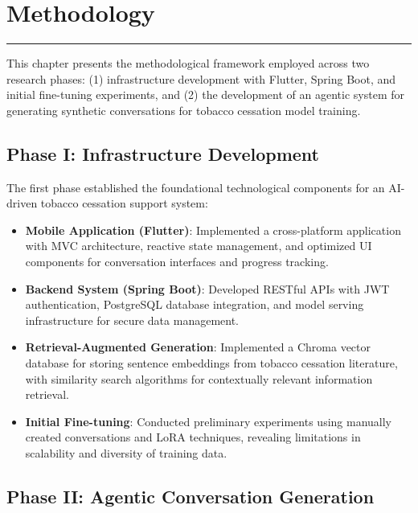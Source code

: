 \chapter{Methodology}
\label{Chapter4}

\begin{center}
\rule{0.5\textwidth}{0.5pt}
\end{center}

This chapter presents the methodological framework employed across two research phases: (1) infrastructure development with Flutter, Spring Boot, and initial fine-tuning experiments, and (2) the development of an agentic system for generating synthetic conversations for tobacco cessation model training.

\section{Phase I: Infrastructure Development}

The first phase established the foundational technological components for an AI-driven tobacco cessation support system:

\begin{itemize}
    \item \textbf{Mobile Application (Flutter)}: Implemented a cross-platform application with MVC architecture, reactive state management, and optimized UI components for conversation interfaces and progress tracking.

    \item \textbf{Backend System (Spring Boot)}: Developed RESTful APIs with JWT authentication, PostgreSQL database integration, and model serving infrastructure for secure data management.

    \item \textbf{Retrieval-Augmented Generation}: Implemented a Chroma vector database for storing sentence embeddings from tobacco cessation literature, with similarity search algorithms for contextually relevant information retrieval.

    \item \textbf{Initial Fine-tuning}: Conducted preliminary experiments using manually created conversations and LoRA techniques, revealing limitations in scalability and diversity of training data.
\end{itemize}

\section{Phase II: Agentic Conversation Generation}

